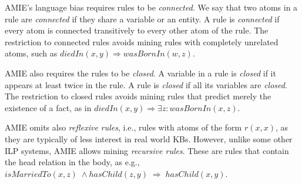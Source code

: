 AMIE's language bias requires rules to be \emph{connected}. We say that two atoms in a rule are \emph{connected} if they share a variable or an entity.
A rule is \emph{connected} if every atom is connected transitively to every other atom of the rule.
The restriction to connected rules avoids mining rules with completely unrelated atoms, such as $diedIn(x,y)\Rightarrow wasBornIn(w,z)$.

AMIE also requires the rules to be \emph{closed}. A variable in a rule is \emph{closed} if it appears at least twice in the rule. A rule is \emph{closed} if all its variables are \emph{closed}.
The restriction to closed rules avoids mining rules that predict merely the existence of a fact, as in $diedIn(x,y)\Rightarrow \exists z:wasBornIn(x,z)$. 

AMIE omits also \emph{reflexive rules}, i.e., rules with atoms of the form $r(x, x)$, as they are typically of less interest in real world KBs.
However, unlike some other ILP systems, AMIE allows mining \emph{recursive rules}. These are rules that contain the head relation in the body, as
e.g., $isMarriedTo(x,z)\; \wedge hasChild(z,y)\; \Rightarrow\; hasChild(x,y)$. 



